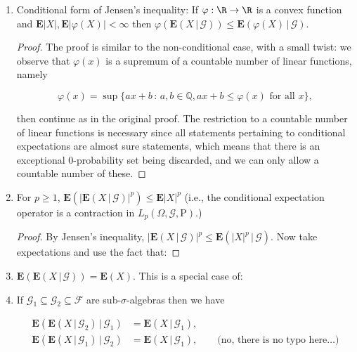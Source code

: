 \begin{enumerate}[label=\arabic*.]
\begin{proof}
\noindent Thus $Z$, qualifies as the conditional expectation of
$X$ given $\mathcal{G}$.
\end{proof}

\item Conditional form of Jensen's inequality: If
$\varphi:\R\to\R$ is a convex function and
$\mathbf{E}|X|, \mathbf{E}|\varphi(X)|<\infty$ then
$\varphi(\mathbf{E}\left(X\,|\,\mathcal{G}\right))
\le
\mathbf{E}\left(\varphi(X)\,|\,\mathcal{G}\right).$

\begin{proof}
The proof is similar to the non-conditional case,
with a small twist: we observe that $\varphi(x)$ is a
supremum of a countable number of linear functions,
namely

\[
\varphi(x) = \sup \{ ax+b\,:\,a,b\in \mathbb{Q}, ax+b\le \varphi(x)\textrm{ for all }x\},
\]

\noindent then continue as in the original proof. The
restriction to a countable number of linear functions
is necessary since all statements pertaining to
conditional expectations are almost sure statements,
which means that there is an exceptional
$0$-probability set being discarded, and we can only
allow a countable number of these.
\end{proof}

\item For $p\ge 1$,
$\mathbf{E}\left(
\left|\mathbf{E}\left(X\,|\,\mathcal{G}\right)\right|^p
\right) \le \mathbf{E}|X|^p$
(i.e., the conditional expectation operator is a
contraction in $L_p(\Omega,\mathcal{G},\mathrm{P})$.)

\begin{proof}
By Jensen's inequality,
$|\mathbf{E}\left(X\,|\,\mathcal{G}\right)|^p \le
\mathbf{E}\left(|X|^p\,|\,\mathcal{G}\right)$.
Now take expectations and use the fact that:
\end{proof}

\item $\mathbf{E}(\mathbf{E}\left(X\,|\,\mathcal{G}\right))
= \mathbf{E}(X)$.
This is a special case of:

\item If
$\mathcal{G}_1\subseteq \mathcal{G}_2 \subseteq
\mathcal{F}$
are sub-$\sigma$-algebras then we have

\begin{align*}
\mathbf{E}\left(\mathbf{E}\left(X\,|\,\mathcal{G}_2\right)\,|\,\mathcal{G}_1\right) &= \mathbf{E}\left(X\,|\,\mathcal{G}_1\right), \\
\mathbf{E}\left(\mathbf{E}\left(X\,|\,\mathcal{G}_1\right)\,|\,\mathcal{G}_2\right) &= \mathbf{E}\left(X\,|\,\mathcal{G}_1\right),
\qquad  \textrm{(no, there is no typo here\ldots)}
\end{align*}


\end{enumerate}
